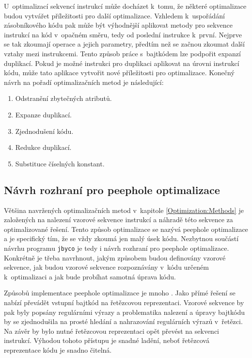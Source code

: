 U~optimalizací sekvencí instrukcí může docházet k~tomu, že některé optimalizace budou vytvářet příležitosti pro další optimalizace. Vzhledem k~uspořádání zásobníkového kódu pak může být výhodnější aplikovat metody pro sekvence instrukcí na kód v~opačném směru, tedy od poslední instrukce k~první. Nejprve se tak zkoumají operace a jejich parametry, předtím než se začnou zkoumat další vztahy mezi instrukcemi. Tento způsob práce s~bajtkódem lze podpořit expanzí duplikací. Pokud je možné instrukci pro duplikaci aplikovat na úrovni instrukcí kódu, může tato aplikace vytvořit nové příležitosti pro optimalizace.
Konečný návrh na pořadí optimalizačních metod je následující:

\begin{enumerate}
\setlength{\itemsep}{0pt}
\setlength{\parskip}{0pt}
\item Odstranění zbytečných atributů.
\item Expanze duplikací. 
\item Zjednodušení kódu.
\item Redukce duplikací.
\item Substituce číselných konstant.
\end{enumerate}


\subsection{Návrh rozhraní pro peephole optimalizace}

Většina navržených optimalizačních metod v~kapitole \ref{Optimization:Methods} je založených na nalezení vzorové sekvence instrukcí a náhradě této sekvence za optimalizované řešení. Tento způsob optimalizace se nazývá peephole optimalizace \cite{} a je specifický tím, že se vždy zkoumá jen malý úsek kódu. Nezbytnou součástí návrhu programu \texttt{jbyco} je tedy i návrh rozhraní pro peephole optimalizace. Konkrétně je třeba navrhnout, jakým způsobem budou definovány vzorové sekvence, jak budou vzorové sekvence rozpoznávány v~kódu určeném k~optimalizaci a jak bude probíhat samotná úprava kódu.

Způsobů implementace peephole optimalizace je mnoho \cite{}. Jako přímé řešení se nabízí převádět vstupní bajtkód na řetězcovou reprezentaci. Vzorové sekvence by pak byly popsány regulárními výrazy a problematika nalezení a úpravy bajtkódu by se zjednodušila na prosté hledání a nahrazování regulárních výrazů v~řetězci. Na závěr by bylo nutné řetězcovou reprezentaci opět převést na sekvenci instrukcí. Výhodou tohoto přístupu je snadné ladění, neboť řetězcová reprezentace kódu je snadno čitelná.

